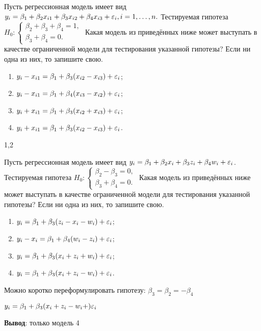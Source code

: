 \begin{problem} %
Пусть регрессионная модель имеет вид $y_i= \beta_1+ \beta_2 x_{i1}+ \beta_3 x_{i2}+ \beta_4 x_{i3}+\varepsilon_i, i=1,\dots,n.$ Тестируемая гипотеза
$H_0:
  \begin{cases}
    \beta_2+ \beta_3+ \beta_4=1, \\
    \beta_3+ \beta_4=0.
 \end{cases}$
Какая модель из приведённых ниже может выступать в качестве ограниченной модели для тестирования указанной гипотезы? Если ни одна из них, то запишите свою.
\begin{enumerate}
\item $y_i-x_{i1} = \beta_1+ \beta_3 (x_{i2}-x_{i3})+ \varepsilon_i$;
\item $y_i-x_{i1} = \beta_1+ \beta_4 (x_{i3}-x_{i2})+ \varepsilon_i$;
\item $y_i+x_{i1} = \beta_1+ \beta_3 (x_{i2}+x_{i3})+ \varepsilon_i$;
\item $y_i+x_{i1} = \beta_1+ \beta_3 (x_{i2}-x_{i3})+ \varepsilon_i$.
\end{enumerate}


\begin{sol}
1,2
\end{sol}
\end{problem}



\begin{problem} %
Пусть регрессионная модель имеет вид $y_i= \beta_1+ \beta_2 x_i+ \beta_3 z_i+ \beta_4 w_i+\varepsilon_i$.
Тестируемая гипотеза
$H_0:
  \begin{cases}
    \beta_2 - \beta_3=0, \\
    \beta_3 + \beta_4=0.
 \end{cases}$
Какая модель из приведённых ниже может выступать в качестве ограниченной модели для тестирования указанной гипотезы? 
Если ни одна из них, то запишите свою.
\begin{enumerate}
\item $y_i = \beta_1 + \beta_3 (z_{i}-x_{i}-w_{i})+ \varepsilon_i$;
\item $y_i-x_{i} = \beta_1+ \beta_4 (w_{i}-z_{i})+ \varepsilon_i$;
\item $y_i = \beta_1+ \beta_3 (x_{i}+z_{i}+w_{i})+ \varepsilon_i$;
\item $y_i = \beta_1+ \beta_3 (x_{i}+z_{i}-w_{i})+ \varepsilon_i$.
\end{enumerate}


\begin{sol}
Можно коротко переформулировать гипотезу: $\beta_3 = \beta_2 = -\beta_4$

$y_i= \beta_1+ \beta_3(x_{i}+ z_{i}- w_{i}+)\varepsilon_i$
 
\textbf{Вывод}: только модель 4

\end{sol}
\end{problem}



